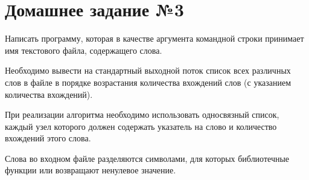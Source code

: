 \section*{Домашнее задание №3}


Написать программу, которая в качестве аргумента командной строки
принимает имя текстового файла, содержащего слова.

Необходимо
вывести на стандартный выходной поток список всех различных слов в
файле в порядке возрастания количества вхождений слов (с указанием
количества вхождений).

При реализации алгоритма необходимо
использовать односвязный список, каждый узел которого должен
содержать указатель на слово и количество вхождений этого слова.

Слова
во входном файле разделяются символами, для которых библиотечные
функции  или  возвращают ненулевое значение.
